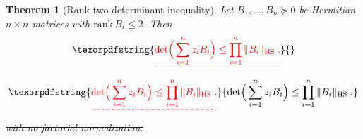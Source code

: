 \documentclass[prx,twocolumn,superscriptaddress,aps,10pt, frontmatterverbose, reprint,footinbib,longbibliography=true]{revtex4-2}
\newtheorem{theorem}{Theorem}
\providecommand{\DIFaddtex}[1]{{\protect\color{red}\uwave{#1}}} %
\providecommand{\DIFdeltex}[1]{{\protect\color{red}\sout{#1}}}                      %
\providecommand{\DIFaddbegin}{\protect\color{red}} %
\providecommand{\DIFaddend}{\protect\color{black}} %
\providecommand{\DIFdelbegin}{} %
\providecommand{\DIFdelend}{} %
\providecommand{\DIFadd}[1]{\texorpdfstring{\DIFaddtex{#1}}{#1}} %
\providecommand{\DIFdel}[1]{\texorpdfstring{\DIFdeltex{#1}}{}} %
\newcommand{\DIFscaledelfig}{0.5}
\newlength{\DIFdelgraphicswidth} %
\newlength{\DIFdelgraphicsheight} %
\newcommand{\DIFaddincludegraphics}[2][]{{\color{blue}\fbox{\DIFOincludegraphics[#1]{#2}}}} %
\newcommand{\DIFdelincludegraphics}[2][]{%
\sbox{\DIFdelgraphicsbox}{\DIFOincludegraphics[#1]{#2}}%
\settoboxwidth{\DIFdelgraphicswidth}{\DIFdelgraphicsbox} %
\settoboxtotalheight{\DIFdelgraphicsheight}{\DIFdelgraphicsbox} %
\scalebox{\DIFscaledelfig}{%
\parbox[b]{\DIFdelgraphicswidth}{\usebox{\DIFdelgraphicsbox}\\[-\baselineskip] \rule{\DIFdelgraphicswidth}{0em}}\llap{\resizebox{\DIFdelgraphicswidth}{\DIFdelgraphicsheight}{%
\setlength{\unitlength}{\DIFdelgraphicswidth}%
\begin{picture}(1,1)%
\thicklines\linethickness{2pt} %
{\color[rgb]{1,0,0}\put(0,0){\framebox(1,1){}}}%
{\color[rgb]{1,0,0}\put(0,0){\line( 1,1){1}}}%
{\color[rgb]{1,0,0}\put(0,1){\line(1,-1){1}}}%
\end{picture}%
}\hspace*{3pt}}} %
} %
\DeclareRobustCommand{\DIFaddbegin}{\DIFOaddbegin \let\includegraphics\DIFaddincludegraphics} %
\DeclareRobustCommand{\DIFaddend}{\DIFOaddend \let\includegraphics\DIFOincludegraphics} %
\DeclareRobustCommand{\DIFdelbegin}{\DIFOdelbegin \let\includegraphics\DIFdelincludegraphics} %
\DeclareRobustCommand{\DIFdelend}{\DIFOaddend \let\includegraphics\DIFOincludegraphics} %
\begin{document}
\begin{theorem}[Rank-two determinant inequality]
\label{thm:MD2}
Let $B_1,\dots,B_n\succeq0$ be Hermitian $n\times n$ matrices with $\mathrm{rank}\,B_i\le2$. Then
\DIFdelbegin \begin{displaymath}
    [\DIFdel{z_1\cdots z_n}]\DIFdel{\det\!\Big(\sum_{i=1}^nz_iB_i\Big)\le\prod_{i=1}^n\|B_i\|_{\mathrm{HS}}\;,
}\end{displaymath}%
\DIFdelend \DIFaddbegin \begin{equation}
    [\DIFadd{z_1\cdots z_n}]\DIFadd{\det\!\Big(\sum_{i=1}^nz_iB_i\Big)\le\prod_{i=1}^n\|B_i\|_{\mathrm{HS}}\;.
    \label{eq:MD2}
}\end{equation}\DIFaddend 
\DIFdelbegin \DIFdel{with no factorial normalization.
}\DIFdelend \end{theorem}
\end{document}
